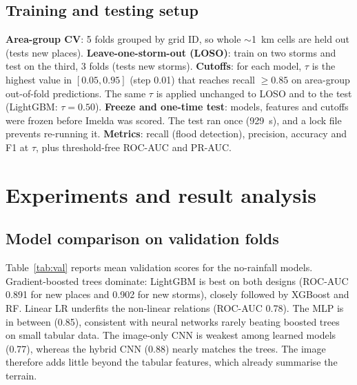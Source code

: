 \documentclass{article}
\begin{document}
\subsection{Training and testing setup}
\textbf{Area-group CV}: 5 folds grouped by grid ID, so whole $\sim$1~km cells are held out (tests new places). \textbf{Leave-one-storm-out (LOSO)}: train on two storms and test on the third, 3 folds (tests new storms). \textbf{Cutoffs}: for each model, $\tau$ is the highest value in $[0.05,0.95]$ (step 0.01) that reaches recall $\ge 0.85$ on area-group out-of-fold predictions. The same $\tau$ is applied unchanged to LOSO and to the test (LightGBM: $\tau=0.50$). \textbf{Freeze and one-time test}: models, features and cutoffs were frozen before Imelda was scored. The test ran once (929~s), and a lock file prevents re-running it. \textbf{Metrics}: recall (flood detection), precision, accuracy and F1 at $\tau$, plus threshold-free ROC-AUC and PR-AUC.

\section{Experiments and result analysis}
\subsection{Model comparison on validation folds}
Table~\ref{tab:val} reports mean validation scores for the no-rainfall models. Gradient-boosted trees dominate: LightGBM is best on both designs (ROC-AUC 0.891 for new places and 0.902 for new storms), closely followed by XGBoost and RF. Linear LR underfits the non-linear relations (ROC-AUC 0.78). The MLP is in between (0.85), consistent with neural networks rarely beating boosted trees on small tabular data. The image-only CNN is weakest among learned models (0.77), whereas the hybrid CNN (0.88) nearly matches the trees. The image therefore adds little beyond the tabular features, which already summarise the terrain.
\end{document}
